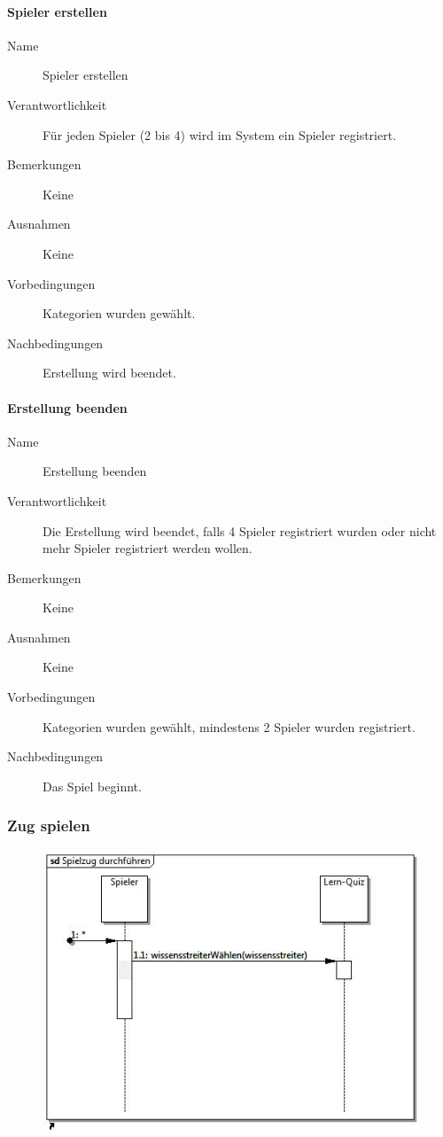 \documentclass{report}
\begin{document}
\paragraph{Spieler erstellen}
\begin{description}
	\item[Name] Spieler erstellen
	\item[Verantwortlichkeit] Für jeden Spieler (2 bis 4) wird im System ein Spieler registriert.
	\item[Bemerkungen] Keine
	\item[Ausnahmen] Keine
	\item[Vorbedingungen] Kategorien wurden gewählt.
	\item[Nachbedingungen] Erstellung wird beendet.
\end{description}

\paragraph{Erstellung beenden}
\begin{description}
	\item[Name] Erstellung beenden
	\item[Verantwortlichkeit] Die Erstellung wird beendet, falls 4 Spieler registriert wurden oder nicht mehr Spieler registriert werden wollen.
	\item[Bemerkungen] Keine
	\item[Ausnahmen] Keine
	\item[Vorbedingungen] Kategorien wurden gewählt, mindestens 2 Spieler wurden registriert.
	\item[Nachbedingungen] Das Spiel beginnt.
\end{description}

\subsubsection{Zug spielen}
\begin{figure}[H]
	\includegraphics[width=\textwidth]{Diagramme/SequenceDiagram-Spielzug.jpg}
	\centering
\end{figure}
\end{document}
